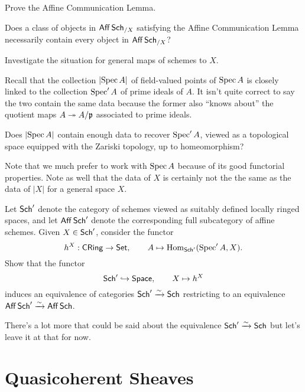 \documentclass[11pt]{article}
\begin{document}
\begin{exercise}
\hfill
\begin{enum}{\alph}
\item Prove the Affine Communication Lemma.

\item Does a class of objects in $\operatorname{\mathsf{Aff}}\operatorname{\mathsf{Sch}}_{/X}$ satisfying the Affine Communication Lemma necessarily contain every object in $\operatorname{\mathsf{Aff}}\operatorname{\mathsf{Sch}}_{/X}$?

\item Investigate the situation for general maps of schemes to $X$.
\end{enum}
\end{exercise}

Recall that the collection $\left\lvert\operatorname{Spec} A\right\rvert$ of field-valued points of $\operatorname{Spec} A$ is closely linked to the collection $\operatorname{Spec}'A$ of prime ideals of $A$. It isn't quite correct to say the two contain the same data because the former also ``knows about'' the quotient maps $A\twoheadrightarrow A/\mathfrak{p}$ associated to prime ideals.

\begin{exercise}
Does $\left\lvert\operatorname{Spec} A\right\rvert$ contain enough data to recover $\operatorname{Spec}'A$, viewed as a topological space equipped with the Zariski topology, up to homeomorphism?
\end{exercise}

Note that we much prefer to work with $\operatorname{Spec} A$ because of its good functorial properties. Note as well that the data of $X$ is certainly not the the same as the data of $|X|$ for a general space $X$. 

\begin{exercise}
Let $\operatorname{\mathsf{Sch}}'$ denote the category of schemes viewed as suitably defined locally ringed spaces, and let $\operatorname{\mathsf{Aff}}\operatorname{\mathsf{Sch}}'$ denote the corresponding full subcategory of affine schemes. Given $X\in\operatorname{\mathsf{Sch}}'$, consider the functor 
$$h^X: \operatorname{\mathsf{CRing}}\to\operatorname{\mathsf{Set}},\qquad A\mapsto\operatorname{Hom}_{\operatorname{\mathsf{Sch}}'}(\operatorname{Spec}'A,X).$$
Show that the functor 
$$\operatorname{\mathsf{Sch}}'\hookrightarrow\operatorname{\mathsf{Space}},\qquad X\mapsto h^X$$
induces an equivalence of categories $\operatorname{\mathsf{Sch}}'\xrightarrow{\sim}\operatorname{\mathsf{Sch}}$ restricting to an equivalence $\operatorname{\mathsf{Aff}}\operatorname{\mathsf{Sch}}'\xrightarrow{\sim}\operatorname{\mathsf{Aff}}\operatorname{\mathsf{Sch}}$.
\end{exercise}

There's a lot more that could be said about the equivalence $\operatorname{\mathsf{Sch}}'\xrightarrow{\sim}\operatorname{\mathsf{Sch}}$ but let's leave it at that for now.

\section{Quasicoherent Sheaves}
\end{document}
